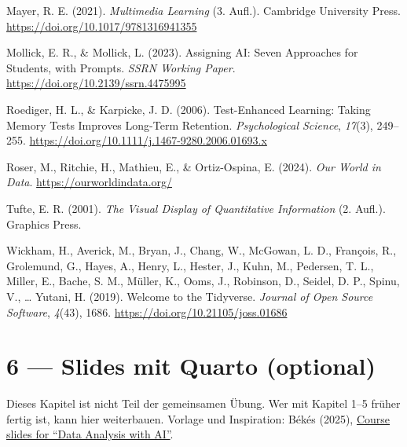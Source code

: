 \documentclass[
  ngerman,
  a4paper,
  DIV=11]{scrreprt}
\newlength{\cslhangindent}
\newenvironment{CSLReferences}[2] %
 {\begin{list}{}{%
  \setlength{\itemindent}{0pt}
  \setlength{\leftmargin}{0pt}
  \setlength{\parsep}{0pt}
  \ifodd #1
   \setlength{\leftmargin}{\cslhangindent}
   \setlength{\itemindent}{-1\cslhangindent}
  \fi
  \setlength{\itemsep}{#2\baselineskip}}}
 {\end{list}}
\begin{document}
\begin{CSLReferences}{1}{0}
Mayer, R. E. (2021). \emph{Multimedia Learning} (3. Aufl.). Cambridge
University Press. \url{https://doi.org/10.1017/9781316941355}

Mollick, E. R., \& Mollick, L. (2023). Assigning {AI}: Seven Approaches
for Students, with Prompts. \emph{SSRN Working Paper}.
\url{https://doi.org/10.2139/ssrn.4475995}

Roediger, H. L., \& Karpicke, J. D. (2006). Test-Enhanced Learning:
Taking Memory Tests Improves Long-Term Retention. \emph{Psychological
Science}, \emph{17}(3), 249--255.
\url{https://doi.org/10.1111/j.1467-9280.2006.01693.x}

Roser, M., Ritchie, H., Mathieu, E., \& Ortiz-Ospina, E. (2024).
\emph{Our World in Data}. \url{https://ourworldindata.org/}

Tufte, E. R. (2001). \emph{The Visual Display of Quantitative
Information} (2. Aufl.). Graphics Press.

Wickham, H., Averick, M., Bryan, J., Chang, W., McGowan, L. D.,
François, R., Grolemund, G., Hayes, A., Henry, L., Hester, J., Kuhn, M.,
Pedersen, T. L., Miller, E., Bache, S. M., Müller, K., Ooms, J.,
Robinson, D., Seidel, D. P., Spinu, V., \ldots{} Yutani, H. (2019).
Welcome to the Tidyverse. \emph{Journal of Open Source Software},
\emph{4}(43), 1686. \url{https://doi.org/10.21105/joss.01686}

\end{CSLReferences}

\chapter{6 --- Slides mit Quarto
(optional)}\label{slides-mit-quarto-optional}

\begin{tcolorbox}[enhanced jigsaw, opacitybacktitle=0.6, leftrule=.75mm, title=\textcolor{quarto-callout-note-color}{\faInfo}\hspace{0.5em}{Optional, für Fortgeschrittene}, colframe=quarto-callout-note-color-frame, arc=.35mm, toprule=.15mm, colbacktitle=quarto-callout-note-color!10!white, bottomrule=.15mm, colback=white, rightrule=.15mm, breakable, toptitle=1mm, bottomtitle=1mm, opacityback=0, titlerule=0mm, coltitle=black, left=2mm]

Dieses Kapitel ist nicht Teil der gemeinsamen Übung. Wer mit Kapitel
1--5 früher fertig ist, kann hier weiterbauen. Vorlage und Inspiration:
Békés (2025),
\href{https://gabors-data-analysis.com/courses/da-w-ai-2025/da-w-ai-01-llm-course.html}{Course
slides for ``Data Analysis with AI''}.

\end{tcolorbox}
\end{document}
